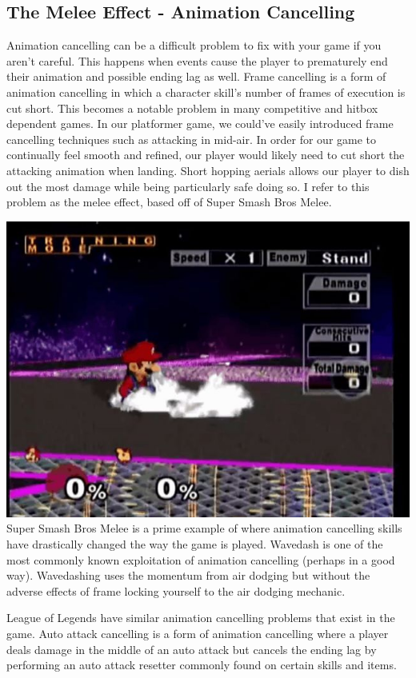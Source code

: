 \documentclass[12pt]{article}
\begin{document}
\subsection{The Melee Effect - Animation Cancelling}
Animation cancelling can be a difficult problem to fix with your game if you aren't careful. This happens when events cause the player to prematurely end their animation and possible ending lag as well. Frame cancelling is a form of animation cancelling in which a character skill's number of frames of execution is cut short. This becomes a notable problem in many competitive and hitbox dependent games. In our platformer game, we could've easily introduced frame cancelling techniques such as attacking in mid-air. In order for our game to continually feel smooth and refined, our player would likely need to cut short the attacking animation when landing. Short hopping aerials allows our player to dish out the most damage while being particularly safe doing so. I refer to this problem as the melee effect, based off of Super Smash Bros Melee.

\includegraphics[scale=0.4]{Figure0441} \\

Super Smash Bros Melee is a prime example of where animation cancelling skills have drastically changed the way the game is played. Wavedash is one of the most commonly known exploitation of animation cancelling (perhaps in a good way). Wavedashing uses the momentum from air dodging but without the adverse effects of frame locking yourself to the air dodging mechanic. 

League of Legends have similar animation cancelling problems that exist in the game. Auto attack cancelling is a form of animation cancelling where a player deals damage in the middle of an auto attack but cancels the ending lag by performing an auto attack resetter commonly found on certain skills and items.
\end{document}
